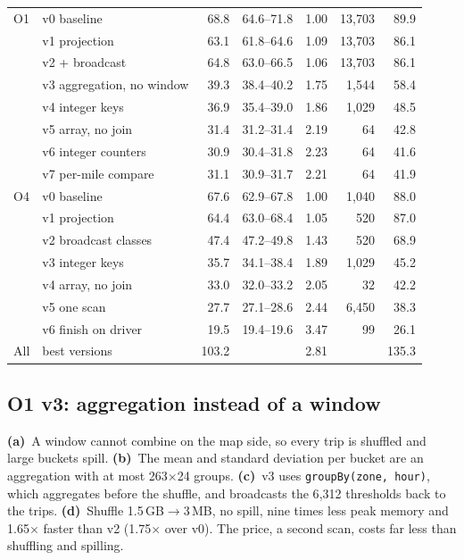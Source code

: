 \documentclass[sigconf]{acmart}
\newcommand{\pa}{\textbf{(a)}~}\newcommand{\pb}{\textbf{(b)}~}\newcommand{\pc}{\textbf{(c)}~}\newcommand{\pd}{\textbf{(d)}~}
\begin{document}
\begin{table}[t]
\begin{tabular}[t]{@{}llrrrrr@{}}
\midrule
O1 & v0 baseline & 68.8 & 64.6--71.8 & 1.00 & 13{,}703 & 89.9 \\
 & v1 projection & 63.1 & 61.8--64.6 & 1.09 & 13{,}703 & 86.1 \\
 & v2 + broadcast & 64.8 & 63.0--66.5 & 1.06 & 13{,}703 & 86.1 \\
 & v3 aggregation, no window & 39.3 & 38.4--40.2 & 1.75 & 1{,}544 & 58.4 \\
 & v4 integer keys & 36.9 & 35.4--39.0 & 1.86 & 1{,}029 & 48.5 \\
 & v5 array, no join & 31.4 & 31.2--31.4 & 2.19 & 64 & 42.8 \\
 & v6 integer counters & 30.9 & 30.4--31.8 & 2.23 & 64 & 41.6 \\
 & v7 per-mile compare & 31.1 & 30.9--31.7 & 2.21 & 64 & 41.9 \\
\midrule
O4 & v0 baseline & 67.6 & 62.9--67.8 & 1.00 & 1{,}040 & 88.0 \\
 & v1 projection & 64.4 & 63.0--68.4 & 1.05 & 520 & 87.0 \\
 & v2 broadcast classes & 47.4 & 47.2--49.8 & 1.43 & 520 & 68.9 \\
 & v3 integer keys & 35.7 & 34.1--38.4 & 1.89 & 1{,}029 & 45.2 \\
 & v4 array, no join & 33.0 & 32.0--33.2 & 2.05 & 32 & 42.2 \\
 & v5 one scan & 27.7 & 27.1--28.6 & 2.44 & 6{,}450 & 38.3 \\
 & v6 finish on driver & 19.5 & 19.4--19.6 & 3.47 & 99 & 26.1 \\
\midrule
All & best versions & 103.2 & & 2.81 & & 135.3 \\
\bottomrule
\end{tabular}
\end{table}

\subsection{O1 v3: aggregation instead of a window}
\pa A window cannot combine on the map side, so every trip is shuffled and large buckets spill. \pb The mean and standard deviation per bucket are an aggregation with at most 263$\times$24 groups. \pc v3 uses \texttt{groupBy(zone, hour)}, which aggregates before the shuffle, and
broadcasts the 6{,}312 thresholds back to the trips. \pd Shuffle 1.5\,GB$\rightarrow$3\,MB, no spill, nine times less peak memory and 1.65$\times$ faster than v2 (1.75$\times$ over v0). The price, a second scan, costs far less than shuffling and spilling.
\end{document}
